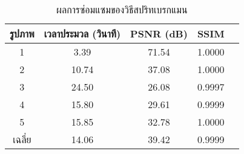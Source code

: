 \begin{table}[H]
	\centering
	\begin{tabular}[ht]{|c|c|c|c|c|}
		\hline
		รูปภาพ &เวลาประมวล  (วินาที) & PSNR (dB) & SSIM \\
		\hline
		1 & 3.39 & 71.54 & 1.0000 \\ 
		2 & 10.74 & 37.08 & 1.0000 \\
		3 &  24.50 & 26.08 & 0.9997 \\
		4 & 15.80  & 29.61  & 0.9999 \\
		5 & 15.85  & 32.78  & 1.0000 \\
		\hline
		เฉลี่ย & 14.06  & 39.42  & 0.9999 \\
		\hline
	\end{tabular}
	\caption{ผลการซ่อมแซมของวิธีสปริทเบรกแมน}
	\label{table:result-splitbregman}
\end{table}